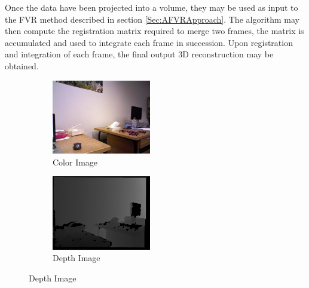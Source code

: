 Once the data have been projected into a volume, they may be used as input to the FVR method described in section \ref{Sec:AFVRApproach}. The algorithm may then compute the registration matrix required to merge two frames, the matrix is accumulated and used to integrate each frame in succession. Upon registration and integration of each frame, the final output 3D reconstruction may be obtained. \\

\begin{figure}[!htb] 
        \centering
        \begin{subfigure}[b]{1.8in}
                \includegraphics[width=1.7in]{images/ch2/colorF11}
                \caption{Color Image}
                \label{fig:COLEXAMPLE}
        \end{subfigure}%
        \begin{subfigure}[b]{1.8in}
                \includegraphics[width=1.7in]{images/ch2/depthF11}
                \caption{Depth Image}
                \label{fig:DEPTHEXAMPLE}
        \end{subfigure}
        

\end{figure}
